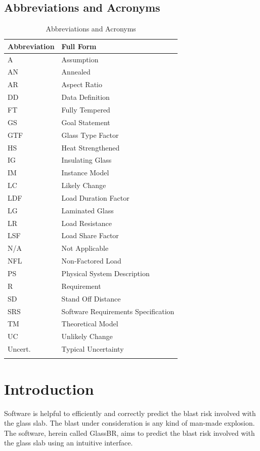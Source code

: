 \documentclass[12pt]{article}
\begin{document}
\subsection{Abbreviations and Acronyms}
\label{Sec:TAbbAcc}
\begin{longtable}{l l}
\toprule
\textbf{Abbreviation} & \textbf{Full Form}
\\
\midrule
\endhead
A & Assumption
\\
AN & Annealed
\\
AR & Aspect Ratio
\\
DD & Data Definition
\\
FT & Fully Tempered
\\
GS & Goal Statement
\\
GTF & Glass Type Factor
\\
HS & Heat Strengthened
\\
IG & Insulating Glass
\\
IM & Instance Model
\\
LC & Likely Change
\\
LDF & Load Duration Factor
\\
LG & Laminated Glass
\\
LR & Load Resistance
\\
LSF & Load Share Factor
\\
N/A & Not Applicable
\\
NFL & Non-Factored Load
\\
PS & Physical System Description
\\
R & Requirement
\\
SD & Stand Off Distance
\\
SRS & Software Requirements Specification
\\
TM & Theoretical Model
\\
UC & Unlikely Change
\\
Uncert. & Typical Uncertainty
\\
\bottomrule
\caption{Abbreviations and Acronyms}
\label{Table:TAbbAcc}
\end{longtable}
\section{Introduction}
\label{Sec:Intro}
Software is helpful to efficiently and correctly predict the blast risk involved with the glass slab. The blast under consideration is any kind of man-made explosion. The software, herein called GlassBR, aims to predict the blast risk involved with the glass slab using an intuitive interface.
\end{document}
